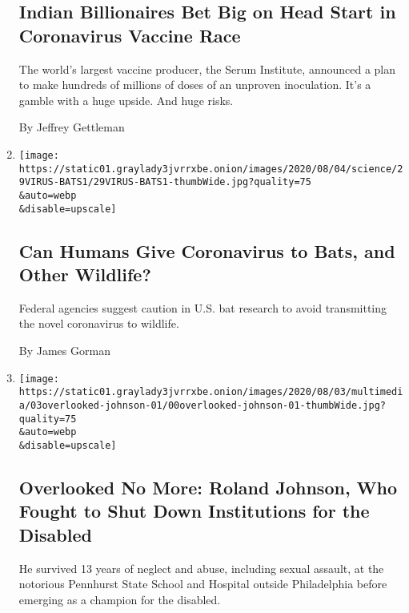 \begin{enumerate}
{  \subsection{Indian Billionaires Bet Big on Head Start in Coronavirus
  Vaccine
  Race}\label{indian-billionaires-bet-big-on-head-start-in-coronavirus-vaccine-race}}

  The world's largest vaccine producer, the Serum Institute, announced a
  plan to make hundreds of millions of doses of an unproven inoculation.
  It's a gamble with a huge upside. And huge risks.

  By Jeffrey Gettleman
\item
  \href{/2020/08/01/science/Covid-bats.html}{}

  \texttt{[image: https://static01.graylady3jvrrxbe.onion/images/2020/08/04/science/29VIRUS-BATS1/29VIRUS-BATS1-thumbWide.jpg?quality=75\\\&auto=webp\\\&disable=upscale]}

  \hypertarget{can-humans-give-coronavirus-to-bats-and-other-wildlife}{%
  \subsection{Can Humans Give Coronavirus to Bats, and Other
  Wildlife?}\label{can-humans-give-coronavirus-to-bats-and-other-wildlife}}

  Federal agencies suggest caution in U.S. bat research to avoid
  transmitting the novel coronavirus to wildlife.

  By James Gorman
\item
  \href{/2020/07/31/obituaries/roland-johnson-overlooked.html}{}

  \texttt{[image: https://static01.graylady3jvrrxbe.onion/images/2020/08/03/multimedia/03overlooked-johnson-01/00overlooked-johnson-01-thumbWide.jpg?quality=75\\\&auto=webp\\\&disable=upscale]}

  \hypertarget{overlooked-no-more-roland-johnson-who-fought-to-shut-down-institutions-for-the-disabled}{%
  \subsection{Overlooked No More: Roland Johnson, Who Fought to Shut
  Down Institutions for the
  Disabled}\label{overlooked-no-more-roland-johnson-who-fought-to-shut-down-institutions-for-the-disabled}}

  He survived 13 years of neglect and abuse, including sexual assault,
  at the notorious Pennhurst State School and Hospital outside
  Philadelphia before emerging as a champion for the disabled.


\end{enumerate}
